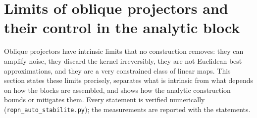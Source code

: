 \documentclass[11pt,a4paper]{article}
\theoremstyle{plain}
\theoremstyle{definition}
\theoremstyle{remark}
\begin{document}
\section{Limits of oblique projectors and their control in the analytic block}
\label{sec:stability}
Oblique projectors have intrinsic limits that no construction removes: they
can amplify noise, they discard the kernel irreversibly, they are not
Euclidean best approximations, and they are a very constrained class of
linear maps. This section states these limits precisely, separates what is
intrinsic from what depends on how the blocks are assembled, and shows how
the analytic construction bounds or mitigates them. Every statement is
verified numerically (\texttt{ropn\_auto\_stabilite.py}); the measurements
are reported with the statements.
\end{document}
